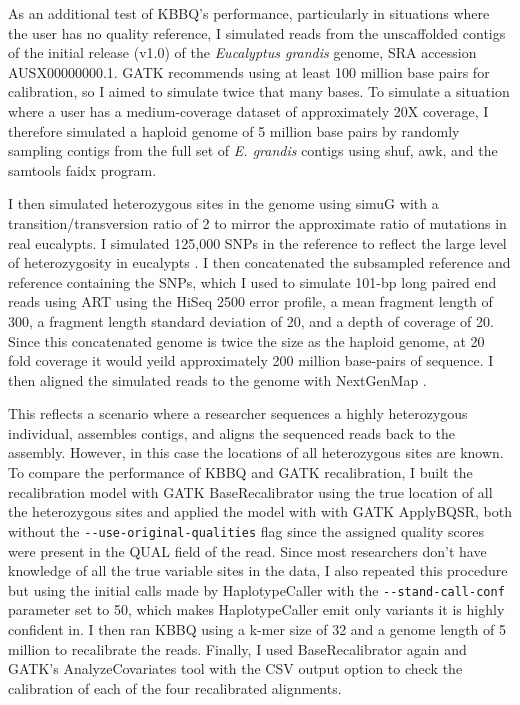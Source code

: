 As an additional test of KBBQ's performance, particularly in situations where the user has no quality reference, I simulated reads from the unscaffolded contigs of the initial release (v1.0) of the \textit{Eucalyptus grandis} genome, SRA accession AUSX00000000.1. GATK recommends using at least 100 million base pairs for calibration, so I aimed to simulate twice that many bases. To simulate a situation where a user has a medium-coverage dataset of approximately 20X coverage, I therefore simulated a haploid genome of 5 million base pairs by randomly sampling contigs from the full set of \textit{E. grandis} contigs using shuf, awk, and the samtools faidx program.

I then simulated heterozygous sites in the genome using simuG \parencite{yue_simug_2019} with a transition/transversion ratio of 2 to mirror the approximate ratio of mutations in real eucalypts. I simulated 125,000 SNPs in the reference to reflect the large level of heterozygosity in eucalypts \parencite{kulheim_comparative_2009}. I then concatenated the subsampled reference and reference containing the SNPs, which I used to simulate 101-bp long paired end reads using ART \parencite{huang_art_2012} using the HiSeq 2500 error profile, a mean fragment length of 300, a fragment length standard deviation of 20, and a depth of coverage of 20. Since this concatenated genome is twice the size as the haploid genome, at 20 fold coverage it would yeild approximately 200 million base-pairs of sequence. I then aligned the simulated reads to the genome with NextGenMap \parencite{sedlazeck_nextgenmap_2013}.

This reflects a scenario where a researcher sequences a highly heterozygous individual, assembles contigs, and aligns the sequenced reads back to the assembly. However, in this case the locations of all heterozygous sites are known. To compare the performance of KBBQ and GATK recalibration, I built the recalibration model with GATK BaseRecalibrator using the true location of all the heterozygous sites and applied the model with with GATK ApplyBQSR, both without the \texttt{-\phantom{}-use-original-qualities} flag since the assigned quality scores were present in the QUAL field of the read. Since most researchers don't have knowledge of all the true variable sites in the data, I also repeated this procedure but using the initial calls made by HaplotypeCaller with the \texttt{-\phantom{}-stand-call-conf} parameter set to 50, which makes HaplotypeCaller emit only variants it is highly confident in. I then ran KBBQ using a k-mer size of 32 and a genome length of 5 million to recalibrate the reads. Finally, I used BaseRecalibrator again and GATK's AnalyzeCovariates tool with the CSV output option to check the calibration of each of the four recalibrated alignments.

